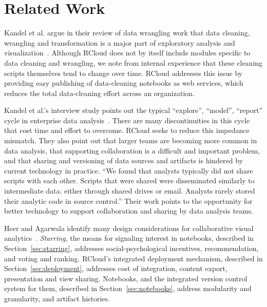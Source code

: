 \documentclass[review,journal]{vgtc}         %
\begin{document}


\section{Related Work}

Kandel et al. argue in their review of data wrangling work that data
cleaning, wrangling and transformation is a major part of exploratory
analysis and visualization~\cite{Kandel:2011:RDI}. Although RCloud
does not by itself include modules specific to data cleaning and
wrangling, we note from internal experience that these cleaning
scripts themselves tend to change over time. RCloud addresses this
issue by providing easy publishing of data-cleaning notebooks as web
services, which reduces the total data-cleaning effort across an
organization.

Kandel et al.'s interview study points out the typical ``explore'',
``model'', ``report'' cycle in enterprise data
analysis~\cite{Kandel:2012:EDA}. There are many discontinuities in
this cycle that cost time and effort to overcome. RCloud seeks to
reduce this impedance mismatch. They also point out that larger teams
are becoming more common in data analysis, that supporting
collaboration is a difficult and important problem, and that sharing
and versioning of data sources and artifacts is hindered by current
technology in practice. ``We found that analysts typically did not
share scripts with each other. Scripts that were shared were
disseminated similarly to intermediate data: either through shared
drives or email. Analysts rarely stored their analytic code in source
control.'' Their work points to the opportunity for better technology
to support collaboration and sharing by data analysis teams.

Heer and Agarwala identify many design considerations for
collaborative visual analytics~\cite{Heer:2008:DCF}. \emph{Starring},
the means for signaling interest in notebooks, described in
Section~\ref{sec:starring}, addresses social-psychological incentives,
recommendation, and voting and ranking. RCloud's integrated deployment
mechanism, described in Section~\ref{sec:deployment}, addresses cost of
integration, content export, presentation and view sharing. Notebooks,
and the integrated version control system for them, described in
Section~\ref{sec:notebooks}, address modularity and granularity, and
artifact histories.
\end{document}
